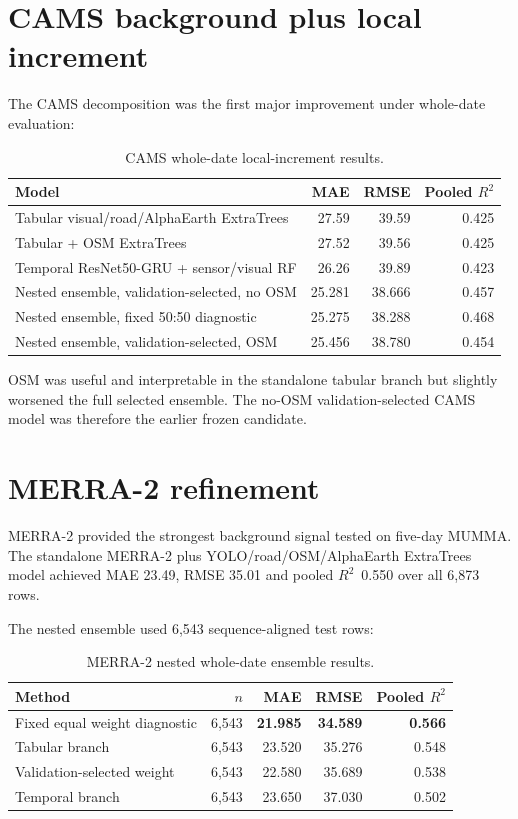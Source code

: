 \documentclass[11pt,a4paper,oneside]{report}
\newcommand{\Rtwo}{$R^2$}
\begin{document}
\section{CAMS background plus local increment}
The CAMS decomposition was the first major improvement under whole-date
evaluation:
\begin{table}[H]
  \centering
  \caption{CAMS whole-date local-increment results.}
  \label{tab:cams}
  \begin{tabular}{lrrr}
    \toprule
    Model & MAE & RMSE & Pooled \Rtwo\\
    \midrule
    Tabular visual/road/AlphaEarth ExtraTrees & 27.59 & 39.59 & 0.425\\
    Tabular + OSM ExtraTrees & 27.52 & 39.56 & 0.425\\
    Temporal ResNet50-GRU + sensor/visual RF & 26.26 & 39.89 & 0.423\\
    Nested ensemble, validation-selected, no OSM & 25.281 & 38.666 & 0.457\\
    Nested ensemble, fixed 50:50 diagnostic & 25.275 & 38.288 & 0.468\\
    Nested ensemble, validation-selected, OSM & 25.456 & 38.780 & 0.454\\
    \bottomrule
  \end{tabular}
\end{table}
OSM was useful and interpretable in the standalone tabular branch but slightly
worsened the full selected ensemble. The no-OSM validation-selected CAMS model
was therefore the earlier frozen candidate.

\section{MERRA-2 refinement}
MERRA-2 provided the strongest background signal tested on five-day MUMMA.
The standalone MERRA-2 plus YOLO/road/OSM/AlphaEarth ExtraTrees model achieved
MAE 23.49, RMSE 35.01 and pooled \Rtwo\ 0.550 over all 6,873 rows.

The nested ensemble used 6,543 sequence-aligned test rows:
\begin{table}[H]
  \centering
  \caption{MERRA-2 nested whole-date ensemble results.}
  \label{tab:merra}
  \begin{tabular}{lrrrr}
    \toprule
    Method & $n$ & MAE & RMSE & Pooled \Rtwo\\
    \midrule
    Fixed equal weight diagnostic & 6,543 & \textbf{21.985} &
      \textbf{34.589} & \textbf{0.566}\\
    Tabular branch & 6,543 & 23.520 & 35.276 & 0.548\\
    Validation-selected weight & 6,543 & 22.580 & 35.689 & 0.538\\
    Temporal branch & 6,543 & 23.650 & 37.030 & 0.502\\
    \bottomrule
  \end{tabular}
\end{table}
\end{document}
